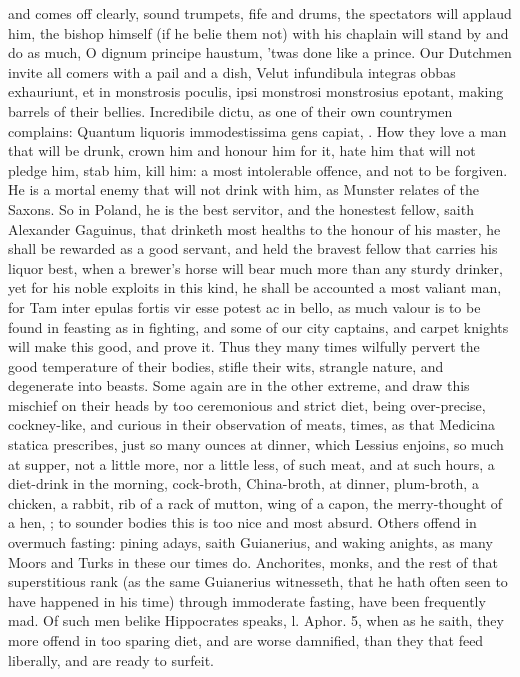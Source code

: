 {and comes off clearly, sound trumpets, fife and drums, the spectators
will applaud him, the bishop himself (if he belie them not) with
his chaplain will stand by and do as much, O dignum principe haustum,
'twas done like a prince. Our Dutchmen invite all comers with a pail
and a dish, Velut infundibula integras obbas exhauriunt, et in
monstrosis poculis, ipsi monstrosi monstrosius epotant, making barrels
of their bellies. Incredibile dictu, as one of their own
countrymen complains: Quantum liquoris immodestissima gens
capiat, \etc{}. How they love a man that will be drunk, crown him and
honour him for it, hate him that will not pledge him, stab him, kill
him: a most intolerable offence, and not to be forgiven. He is a
mortal enemy that will not drink with him, as Munster relates of the
Saxons. So in Poland, he is the best servitor, and the honestest
fellow, saith Alexander Gaguinus,  that drinketh most healths to
the honour of his master, he shall be rewarded as a good servant, and
held the bravest fellow that carries his liquor best, when a brewer's
horse will bear much more than any sturdy drinker, yet for his noble
exploits in this kind, he shall be accounted a most valiant man, for
Tam inter epulas fortis vir esse potest ac in bello, as much
valour is to be found in feasting as in fighting, and some of our city
captains, and carpet knights will make this good, and prove it. Thus
they many times wilfully pervert the good temperature of their bodies,
stifle their wits, strangle nature, and degenerate into beasts.
Some again are in the other extreme, and draw this mischief on their
heads by too ceremonious and strict diet, being over-precise,
cockney-like, and curious in their observation of meats, times, as that
Medicina statica prescribes, just so many ounces at dinner, which
Lessius enjoins, so much at supper, not a little more, nor a little
less, of such meat, and at such hours, a diet-drink in the morning,
cock-broth, China-broth, at dinner, plum-broth, a chicken, a rabbit,
rib of a rack of mutton, wing of a capon, the merry-thought of a hen,
\etc{}; to sounder bodies this is too nice and most absurd. Others offend
in overmuch fasting: pining adays, saith  Guianerius, and waking
anights, as many Moors and Turks in these our times do. Anchorites,
monks, and the rest of that superstitious rank (as the same Guianerius
witnesseth, that he hath often seen to have happened in his time)
through immoderate fasting, have been frequently mad. Of such men
belike Hippocrates speaks, l. Aphor. 5, when as he saith, they
more offend in too sparing diet, and are worse damnified, than they
that feed liberally, and are ready to surfeit.

}
